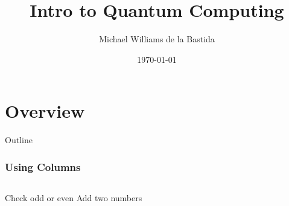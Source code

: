 \documentclass{beamer}
\title{Intro to Quantum Computing}
\author{Michael Williams de la Bastida}
\institute{UCL}
\date{\today}
\begin{document}
\begin{frame}
    \titlepage
\end{frame}

\section{Overview}

\begin{frame}{Outline}
    \tableofcontents
\end{frame}

\begin{frame}
    \frametitle{Using Columns}
    \begin{columns}
    Check odd or even
    Add two numbers
    \end{columns}
\end{frame}
\end{document}
